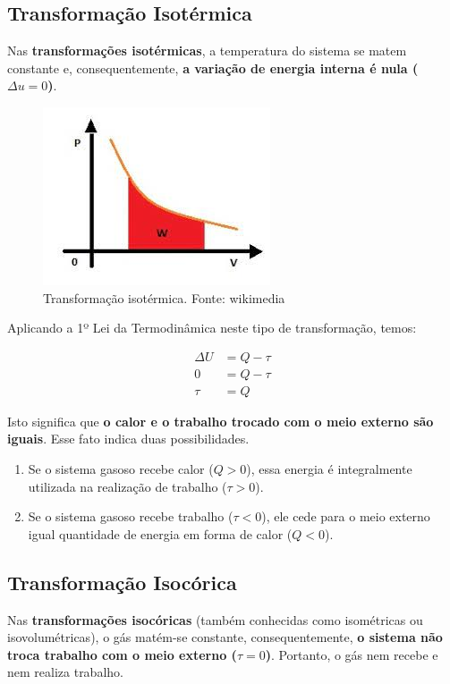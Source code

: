 \documentclass[12pt]{article}
\begin{document}
\hypertarget{x-transformação-isotérmica}{\subsection{Transformação Isotérmica}}
Nas \textbf{transformações isotérmicas}, a temperatura do sistema se matem constante e, consequentemente, \textbf{a variação de energia interna é nula ($\Delta u=0$)}.


\begin{figure}[h]{}
\centering\includegraphics[width=2.5truein]{img8.jpg}
\caption{Transformação isotérmica. Fonte: wikimedia}
\centering
\end{figure}

Aplicando a 1º Lei da Termodinâmica neste tipo de transformação, temos:


\begin{align*}
    \Delta U &= Q - \tau\\
    0 &= Q - \tau\\
    \tau &= Q
\end{align*}


Isto significa que \textbf{o calor e o trabalho trocado com o meio externo são iguais}. Esse fato indica duas possibilidades.


\begin{enumerate}

\item{Se o sistema gasoso recebe calor ($Q>0$), essa energia é integralmente utilizada na realização de trabalho ($\tau>0$).}

\item{Se o sistema gasoso recebe trabalho ($\tau<0$), ele cede para o meio externo igual quantidade de energia em forma de calor ($Q<0$).}

\end{enumerate}


\hypertarget{x-transformação-isocórica}{\subsection{Transformação Isocórica}}
Nas \textbf{transformações isocóricas} (também conhecidas como isométricas ou isovolumétricas), o gás matém-se constante, consequentemente, \textbf{o sistema não troca trabalho com o meio externo ($\tau=0$)}. Portanto, o gás nem recebe e nem realiza trabalho.
\end{document}
